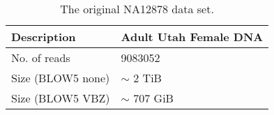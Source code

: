 \begin{table}
    \caption{\label{tab:data-orig}The original NA12878 data set.}
    \begin{tabular}{|l|l|}
        \hline
        Description & Adult Utah Female DNA\\
        \hline
	No. of reads & \num{9083052}\\
	Size (BLOW5 none) &$\sim$ 2 TiB\\
	Size (BLOW5 VBZ) &  $\sim$ 707 GiB\\
	\hline
    \end{tabular}
\end{table}
